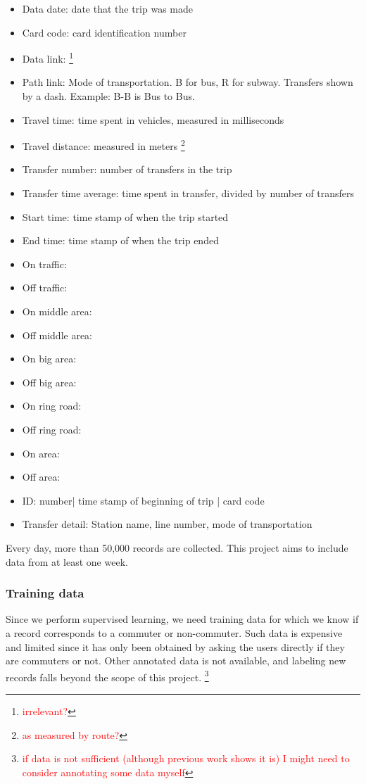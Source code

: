 \documentclass{article}
\newcommand{\selfnote}[1]{\footnote{\textcolor{red}{#1}}}
\begin{document}
\begin{itemize}
\item Data date: date that the trip was made
\item Card code: card identification number
\item Data link: \selfnote{irrelevant?}
\item Path link: Mode of transportation. B for bus, R for subway. Transfers shown by a dash. Example: B-B is Bus to Bus.
\item Travel time: time spent in vehicles, measured in milliseconds
\item Travel distance: measured in meters \footnote{\textcolor{red}{as measured by route?}}
\item Transfer number: number of transfers in the trip
\item Transfer time average: time spent in transfer, divided by number of transfers
\item Start time: time stamp of when the trip started
\item End time: time stamp of when the trip ended
\item On traffic:
\item Off traffic:
\item On middle area:
\item Off middle area:
\item On big area:
\item Off big area:
\item On ring road:
\item Off ring road:
\item On area:
\item Off area:
\item ID: number| time stamp of beginning of trip | card code
\item Transfer detail: Station name, line number, mode of transportation
\end{itemize}

Every day, more than 50,000 records are collected. This project aims to include data from at least one week. 

\subsubsection{Training data}
Since we perform supervised learning, we need training data for which we know if a record corresponds to a commuter or non-commuter. Such data is expensive and limited since it has only been obtained by asking the users directly if they are commuters or not. Other annotated data is not available, and labeling new records falls beyond the scope of this project. \selfnote{if data is not sufficient (although previous work shows it is) I might need to consider annotating some data myself}
\end{document}
